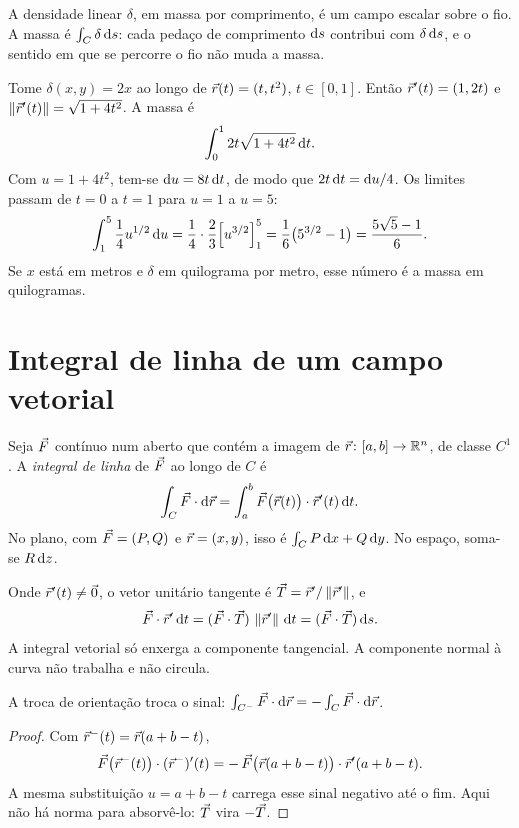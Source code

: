 \documentclass[11pt,a4paper]{article}
\begin{document}
\begin{exemplo}
A densidade linear $\delta$, em massa por comprimento, é um campo escalar sobre o fio. A massa é $\int_C \delta\,\mathrm{d} s$: cada pedaço de comprimento $\mathrm{d} s$ contribui com $\delta\,\mathrm{d} s$, e o sentido em que se percorre o fio não muda a massa.

Tome $\delta(x,y)=2x$ ao longo de $\vec{r}(t)=(t,t^2)$, $t\in[0,1]$. Então $\vec{r}'(t)=(1,2t)$ e $\left\lVert \vec{r}'(t) \right\rVert=\sqrt{1+4t^2}$. A massa é
\[
\int_0^1 2t\sqrt{1+4t^2}\,\mathrm{d} t.
\]
Com $u=1+4t^2$, tem-se $\mathrm{d} u=8t\,\mathrm{d} t$, de modo que $2t\,\mathrm{d} t=\mathrm{d} u/4$. Os limites passam de $t=0$ a $t=1$ para $u=1$ a $u=5$:
\[
\int_1^5 \frac{1}{4}u^{1/2}\,\mathrm{d} u
=\frac{1}{4}\cdot\frac{2}{3}\Bigl[u^{3/2}\Bigr]_1^5
=\frac{1}{6}\bigl(5^{3/2}-1\bigr)
=\frac{5\sqrt{5}-1}{6}.
\]
Se $x$ está em metros e $\delta$ em quilograma por metro, esse número é a massa em quilogramas.
\end{exemplo}

\section{Integral de linha de um campo vetorial}

\begin{definicao}
Seja $\vec{F}$ contínuo num aberto que contém a imagem de $\vec{r}\colon[a,b]\to\mathbb{R}^n$, de classe $C^1$. A \emph{integral de linha} de $\vec{F}$ ao longo de $C$ é
\[
\int_C \vec{F}\cdot\mathrm{d}\vec{r}
=\int_a^b \vec{F}\bigl(\vec{r}(t)\bigr)\cdot\vec{r}'(t)\,\mathrm{d} t.
\]
No plano, com $\vec{F}=(P,Q)$ e $\vec{r}=(x,y)$, isso é $\int_C P\,\mathrm{d} x+Q\,\mathrm{d} y$. No espaço, soma-se $R\,\mathrm{d} z$.
\end{definicao}

Onde $\vec{r}'(t)\neq\vec{0}$, o vetor unitário tangente é $\vec{T}=\vec{r}'/\left\lVert \vec{r}' \right\rVert$, e
\[
\vec{F}\cdot\vec{r}'\,\mathrm{d} t
=(\vec{F}\cdot\vec{T})\,\left\lVert \vec{r}' \right\rVert\,\mathrm{d} t
=(\vec{F}\cdot\vec{T})\,\mathrm{d} s.
\]
A integral vetorial só enxerga a componente tangencial. A componente normal à curva não trabalha e não circula.

\begin{proposicao}
A troca de orientação troca o sinal: $\int_{C^{-}}\vec{F}\cdot\mathrm{d}\vec{r}=-\int_C\vec{F}\cdot\mathrm{d}\vec{r}$.
\end{proposicao}

\begin{proof}
Com $\vec{r}^{-}(t)=\vec{r}(a+b-t)$,
\[
\vec{F}\bigl(\vec{r}^{-}(t)\bigr)\cdot(\vec{r}^{-})'(t)
=-\,\vec{F}\bigl(\vec{r}(a+b-t)\bigr)\cdot\vec{r}'(a+b-t).
\]
A mesma substituição $u=a+b-t$ carrega esse sinal negativo até o fim. Aqui não há norma para absorvê-lo: $\vec{T}$ vira $-\vec{T}$.
\end{proof}
\end{document}
